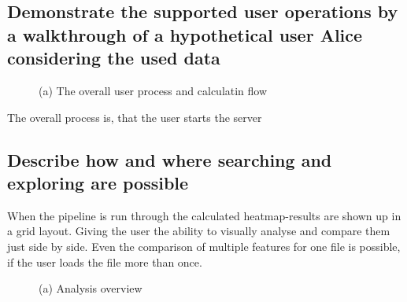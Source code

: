 \documentclass[runningheads]{llncs}
\begin{document}
\subsection{Demonstrate the supported user operations by a walkthrough of a hypothetical user Alice considering the used data}
\begin{figure}
    \centering
    \caption{(a) The overall user process and calculatin flow}
    \label{fig:overall process}
\end{figure}
The overall process is, that the user starts the server 


\subsection{Describe how and where searching and exploring are possible}

When the pipeline is run through the calculated heatmap-results are shown up in a grid layout. Giving the user the ability to visually analyse and compare them just side by side. Even the comparison of multiple features for one file is possible, if the user loads the file more than once.
\begin{figure}
    \centering
    \caption{(a) Analysis overview}
    \label{fig:process analysis}
\end{figure}
\end{document}
